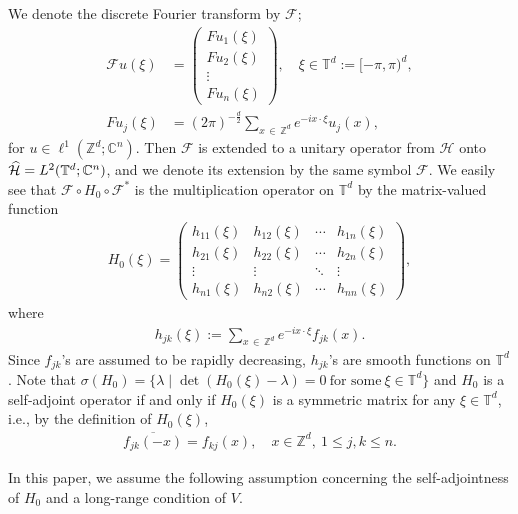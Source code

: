 \documentclass[10pt]{amsart}
\theoremstyle{definition}
\numberwithin{equation}{section}
\newcommand{\x}{\xi}
\newcommand{\C}{\mathbb{C}}
\newcommand{\Z}{\mathbb{Z}}
\newcommand{\T}{\mathbb{T}}
\newcommand{\HS}{\mathcal{H}}
\newcommand{\FS}{\mathcal{F}}
\let\oldhat\hat
\renewcommand*{\hat}[1]{\mathchoice{\widehat{#1}}{\widehat{#1}}{\oldhat{#1}}{\oldhat{#1}}}
\begin{document}
We denote the discrete Fourier transform by $\FS$;
\begin{align*}
\FS u(\xi) &=
\begin{pmatrix}
Fu_1(\xi) \\
Fu_2(\xi) \\
\vdots \\
Fu_n(\xi)
\end{pmatrix}, \quad \xi \in \T^d:=[-\pi,\pi)^d, \\
F u_j(\x) &= (2\pi)^{-\frac{d}{2}}\sum_{x\,\in\,\Z^d}e^{-ix\cdot\x}u_j(x),
\end{align*}
for $u\in \ell^1(\Z^d;\C^n)$. Then $\FS$ is extended to a unitary operator from $\HS$ onto $\hat{\HS}=L^2(\T^d; \C^n)$, and we denote its extension by the same symbol $\FS$. We easily see that $\FS \circ H_0 \circ \FS^*$ is the multiplication operator on $\T^d$ by the matrix-valued function
\begin{align*}
H_0(\xi) = 
\begin{pmatrix}
h_{11}(\xi) & h_{12}(\xi) & \cdots & h_{1n}(\xi) \\
h_{21}(\xi) & h_{22}(\xi) & \cdots & h_{2n}(\xi) \\
\vdots & \vdots & \ddots & \vdots \\
h_{n1}(\xi) & h_{n2}(\xi) & \cdots & h_{nn}(\xi)
\end{pmatrix},
\end{align*}
where
\begin{align*}
h_{jk}(\xi):=\sum_{x\,\in\,\Z^d}e^{-ix\cdot\xi}f_{jk}(x).
\end{align*}
Since $f_{jk}$'s are assumed to be rapidly decreasing, $h_{jk}$'s are smooth functions on $\T^d$. Note that $\sigma(H_0) = \{ \lambda \mid \det (H_0(\xi)-\lambda) =0 \ \text{for some}\ \xi \in \T^d \} $ and $H_0$ is a self-adjoint operator if and only if $H_0(\x)$ is a symmetric matrix for any $\x\in\T^d$, i.e., by the definition of $H_0(\x)$,
\begin{align}\label{selfadj}
\overline{f_{jk}(-x)}=f_{kj}(x), \quad x \in \Z^d, \ 1 \leq j,k \leq n.
\end{align}


In this paper, we assume the following assumption concerning the self-adjointness of $H_0$ and a long-range condition of $V$.
\end{document}
